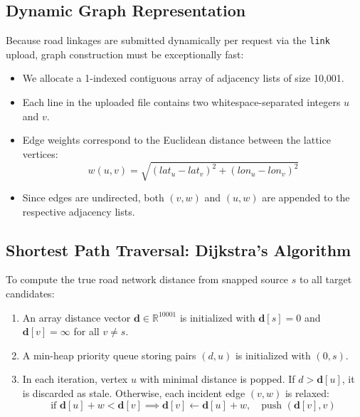 \documentclass[11pt,a4paper]{article}
\begin{document}
\subsection{Dynamic Graph Representation}
Because road linkages are submitted dynamically per request via the \texttt{link} upload, graph construction must be exceptionally fast:
\begin{itemize}
    \item We allocate a 1-indexed contiguous array of adjacency lists of size 10,001.
    \item Each line in the uploaded file contains two whitespace-separated integers $u$ and $v$.
    \item Edge weights correspond to the Euclidean distance between the lattice vertices:
    \begin{equation}
        w(u, v) = \sqrt{(lat_u - lat_v)^2 + (lon_u - lon_v)^2}
    \end{equation}
    \item Since edges are undirected, both $(v, w)$ and $(u, w)$ are appended to the respective adjacency lists.
\end{itemize}

\subsection{Shortest Path Traversal: Dijkstra's Algorithm}
To compute the true road network distance from snapped source $s$ to all target candidates:
\begin{enumerate}
    \item An array distance vector $\mathbf{d} \in \mathbb{R}^{10001}$ is initialized with $\mathbf{d}[s] = 0$ and $\mathbf{d}[v] = \infty$ for all $v \neq s$.
    \item A min-heap priority queue storing pairs $(d, u)$ is initialized with $(0, s)$.
    \item In each iteration, vertex $u$ with minimal distance is popped. If $d > \mathbf{d}[u]$, it is discarded as stale. Otherwise, each incident edge $(v, w)$ is relaxed:
    \begin{equation}
        \text{if } \mathbf{d}[u] + w < \mathbf{d}[v] \implies \mathbf{d}[v] \leftarrow \mathbf{d}[u] + w, \quad \text{push } (\mathbf{d}[v], v)
    \end{equation}
\end{enumerate}
\end{document}
